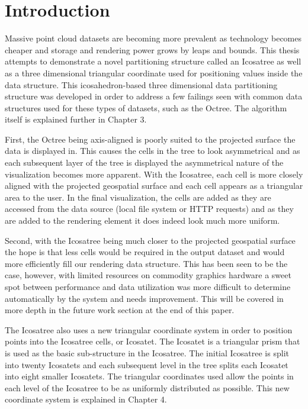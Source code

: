 \chapter{Introduction}


Massive point cloud datasets are becoming more prevalent as technology becomes
cheaper and storage and rendering power grows by leaps and bounds. This thesis
attempts to demonstrate a novel partitioning structure called an Icosatree as
well as a three dimensional triangular coordinate used for positioning values
inside the data structure. This icosahedron-based three dimensional data
partitioning structure was developed in order to address a few failings seen
with common data structures used for these types of datasets, such as the
Octree. The algorithm itself is explained further in Chapter 3.

First, the Octree being axis-aligned is poorly suited to the projected surface
the data is displayed in. This causes the cells in the tree to look asymmetrical
and as each subsequent layer of the tree is displayed the asymmetrical nature of
the visualization becomes more apparent. With the Icosatree, each cell is more
closely aligned with the projected geospatial surface and each cell appears as a
triangular area to the user. In the final visualization, the cells are added as
they are accessed from the data source (local file system or HTTP requests) and
as they are added to the rendering element it does indeed look much more
uniform.

Second, with the Icosatree being much closer to the projected geospatial surface
the hope is that less cells would be required in the output dataset and would
more efficiently fill our rendering data structure. This has been seen to be the
case, however, with limited resources on commodity graphics hardware a sweet
spot between performance and data utilization was more difficult to determine
automatically by the system and needs improvement. This will be covered in more
depth in the future work section at the end of this paper.

The Icosatree also uses a new triangular coordinate system in order to position
points into the Icosatree cells, or Icosatet. The Icosatet is a triangular prism
that is used as the basic sub-structure in the Icosatree. The initial Icosatree
is split into twenty Icosatets and each subsequent level in the tree splits each
Icosatet into eight smaller Icosatets. The triangular coordinates used allow the
points in each level of the Icosatree to be as uniformly distributed as
possible. This new coordinate system is explained in Chapter 4.


